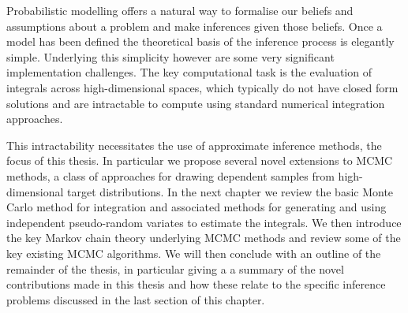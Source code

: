 Probabilistic modelling offers a natural way to formalise our beliefs and assumptions about a problem and make inferences given those beliefs. Once a model has been defined the theoretical basis of the inference process is elegantly simple. Underlying this simplicity however are some very significant implementation challenges. The key computational task is the evaluation of integrals across high-dimensional spaces, which typically do not have closed form solutions and are intractable to compute using standard numerical integration approaches. 

This intractability necessitates the use of approximate inference methods, the focus of this thesis.  In particular we propose several novel extensions to \ac{MCMC} methods, a class of approaches for drawing dependent samples from high-dimensional target distributions. In the next chapter we review the basic Monte Carlo method for integration and associated methods for generating and using independent pseudo-random variates to estimate the integrals. We then introduce the key Markov chain theory underlying \ac{MCMC} methods and review some of the key existing \ac{MCMC} algorithms. We will then conclude with an outline of the remainder of the thesis, in particular giving a a summary of the novel contributions made in this thesis and how these relate to the specific inference problems discussed in the last section of this chapter.






